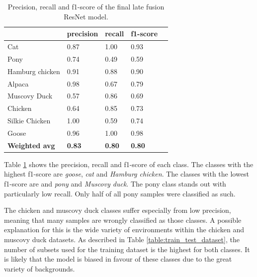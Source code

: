 \documentclass{l4proj}
\begin{document}
\begin{table}[ht]
  \centering
  \begin{tabular}{@{}lllll@{}}
  \toprule
                        & \textbf{precision} & \textbf{recall} & \textbf{f1-score} &  \\ \midrule
  Cat                   & 0.87               & 1.00            & 0.93              &  \\
  Pony                  & 0.74               & 0.49            & 0.59              &  \\
  Hamburg chicken       & 0.91               & 0.88            & 0.90              &  \\
  Alpaca                & 0.98               & 0.67            & 0.79              &  \\
  Muscovy Duck          & 0.57               & 0.86            & 0.69              &  \\
  Chicken               & 0.64               & 0.85            & 0.73              &  \\
  Silkie Chicken        & 1.00               & 0.59            & 0.74              &  \\
  Goose                 & 0.96               & 1.00            & 0.98              &  \\
  \midrule
  \textbf{Weighted avg} & \textbf{0.83}      & \textbf{0.80}   & \textbf{0.80}     &  \\ \bottomrule
  \end{tabular}
  \vspace*{3mm}
  \caption{Precision, recall and f1-score of the final late fusion ResNet model.}
  \label{table:final_classifier_scores}
  \vspace*{-3mm}
\end{table}

Table \ref{table:final_classifier_scores} shows the precision, recall and f1-score of each class. The classes with the highest f1-score are \textit{goose}, \textit{cat} and \textit{Hamburg chicken}. The classes with the lowest f1-score are and \textit{pony} and \textit{Muscovy duck}. The pony class stands out with particularly low recall. Only half of all pony samples were classified as such.

The chicken and muscovy duck classes suffer especially from low precision, meaning that many samples are wrongly classified as those classes. A possible explanation for this is the wide variety of environments within the chicken and muscovy duck datasets. As described in Table \ref{table:train_test_dataset}, the number of subsets used for the training dataset is the highest for both classes. It is likely that the model is biased in favour of these classes due to the great variety of backgrounds. 
\end{document}

